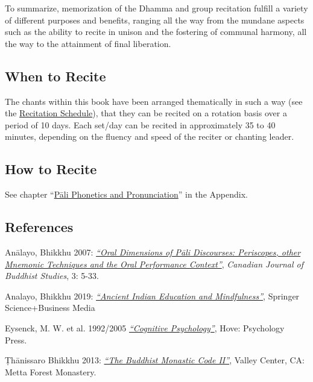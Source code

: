 To summarize, memorization of the Dhamma and group recitation fulfill a variety of different purposes and benefits, ranging all the way from the mundane aspects such as the ability to recite in unison and the fostering of communal harmony, all the way to the attainment of final liberation.

\subsection*{When to Recite}

The chants within this book have been arranged thematically in such a way (see the \hyperref[schedule]{Recitation Schedule}), that they can be recited on a rotation basis over a period of 10 days. Each set/day can be recited in approximately 35 to 40 minutes, depending on the fluency and speed of the reciter or chanting leader.

\subsection*{How to Recite}

See chapter ``\hyperref[phonetics]{Pāli Phonetics and Pronunciation}'' in the Appendix.

\subsection*{References}

Anālayo, Bhikkhu 2007: \href{https://www.buddhismuskunde.uni-hamburg.de/pdf/5-personen/analayo/oral-dimensions.pdf}{\textit{``Oral Dimensions of Pāli Discourses: Periscopes, other Mnemonic Techniques and the Oral Performance Context''}}, \textit{Canadian Journal of Buddhist Studies}, 3: 5-33.

Analayo, Bhikkhu 2019: \href{https://www.buddhismuskunde.uni-hamburg.de/pdf/5-personen/analayo/ancientindianeducation.pdf}{\textit{``Ancient Indian Education and Mindfulness''}}, Springer Science+Business Media

Eysenck, M. W. et al. 1992/2005 \href{https://psycnet.apa.org/record/2015-09422-000}{\textit{``Cognitive Psychology''}}, Hove: Psychology Press.

Ṭhānissaro Bhikkhu 2013:  \href{https://www.dhammatalks.org/Archive/Writings/Ebooks/BMC1&2_200826.pdf}{\textit{``The Buddhist Monastic Code II''}}, Valley Center, CA: Metta Forest Monastery.
